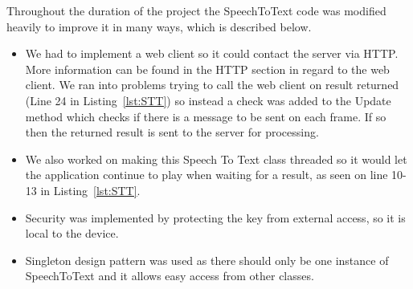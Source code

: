 \par
\medskip

Throughout the duration of the project the SpeechToText code was modified heavily to improve it in many ways, which is described below.

\begin{itemize}
  \item We had to implement a web client so it could contact the server via HTTP. More information can be found in the HTTP section in regard to the web client. We ran into problems trying to call the web client on result returned (Line 24 in Listing~\ref{lst:STT}) so instead a check was added to the Update method which checks if there is a message to be sent on each frame. If so then the returned result is sent to the server for processing.
  \item We also worked on making this Speech To Text class threaded so it would let the application continue to play when waiting for a result, as seen on line 10-13 in Listing~\ref{lst:STT}.
  \item Security was implemented by protecting the key from external access, so it is local to the device.
  \item Singleton design pattern was used as there should only be one instance of SpeechToText and it allows easy access from other classes.
\end{itemize}

